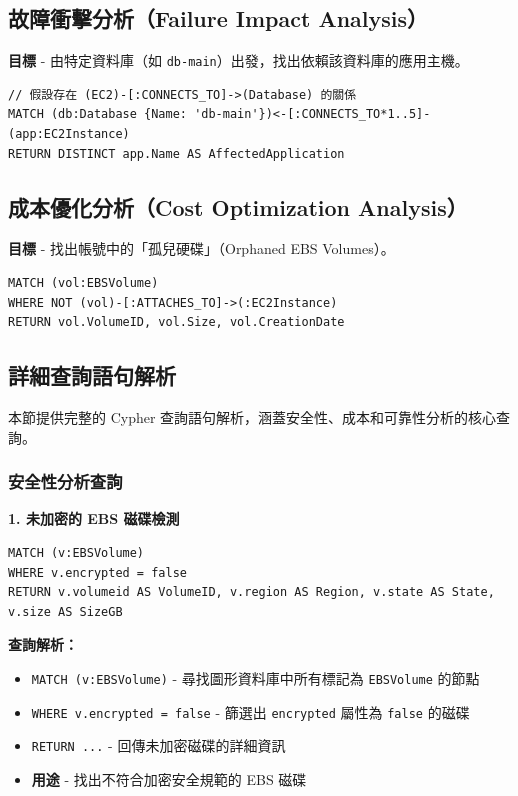 \documentclass[11pt,a4paper]{ctexart}
\begin{document}
\subsection{故障衝擊分析（Failure Impact Analysis）}
\textbf{目標} - 由特定資料庫（如 \texttt{db-main}）出發，找出依賴該資料庫的應用主機。

\begin{lstlisting}[language=Cypher,caption={由資料庫反向追蹤依賴它的應用主機}]
// 假設存在 (EC2)-[:CONNECTS_TO]->(Database) 的關係
MATCH (db:Database {Name: 'db-main'})<-[:CONNECTS_TO*1..5]-(app:EC2Instance)
RETURN DISTINCT app.Name AS AffectedApplication
\end{lstlisting}

\subsection{成本優化分析（Cost Optimization Analysis）}
\textbf{目標} - 找出帳號中的「孤兒硬碟」（Orphaned EBS Volumes）。

\begin{lstlisting}[language=Cypher,caption={找出未連接至任何 EC2 的 EBS 磁碟}]
MATCH (vol:EBSVolume)
WHERE NOT (vol)-[:ATTACHES_TO]->(:EC2Instance)
RETURN vol.VolumeID, vol.Size, vol.CreationDate
\end{lstlisting}

\subsection{詳細查詢語句解析}

本節提供完整的 Cypher 查詢語句解析，涵蓋安全性、成本和可靠性分析的核心查詢。

\subsubsection{安全性分析查詢}

\textbf{1. 未加密的 EBS 磁碟檢測}

\begin{lstlisting}[language=Cypher,caption={找出未加密的 EBS 磁碟}]
MATCH (v:EBSVolume) 
WHERE v.encrypted = false
RETURN v.volumeid AS VolumeID, v.region AS Region, v.state AS State, v.size AS SizeGB
\end{lstlisting}

\textbf{查詢解析：}
\begin{itemize}[leftmargin=1.5em]
\item \texttt{MATCH (v:EBSVolume)} - 尋找圖形資料庫中所有標記為 \texttt{EBSVolume} 的節點
\item \texttt{WHERE v.encrypted = false} - 篩選出 \texttt{encrypted} 屬性為 \texttt{false} 的磁碟
\item \texttt{RETURN ...} - 回傳未加密磁碟的詳細資訊
\item \textbf{用途} - 找出不符合加密安全規範的 EBS 磁碟
\end{itemize}
\end{document}
